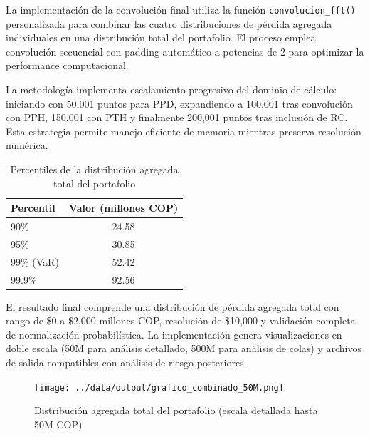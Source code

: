 La implementación de la convolución final utiliza la función \texttt{convolucion\_fft()} personalizada para combinar las cuatro distribuciones de pérdida agregada individuales en una distribución total del portafolio. El proceso emplea convolución secuencial con padding automático a potencias de 2 para optimizar la performance computacional.

La metodología implementa escalamiento progresivo del dominio de cálculo: iniciando con 50,001 puntos para PPD, expandiendo a 100,001 tras convolución con PPH, 150,001 con PTH y finalmente 200,001 puntos tras inclusión de RC. Esta estrategia permite manejo eficiente de memoria mientras preserva resolución numérica.

\begin{table}[H]
\centering
\caption{Percentiles de la distribución agregada total del portafolio}
\begin{tabular}{lc}
\hline
\textbf{Percentil} & \textbf{Valor (millones COP)} \\
\hline
90\% & 24.58 \\
95\% & 30.85 \\
99\% (VaR) & 52.42 \\
99.9\% & 92.56 \\
\hline
\end{tabular}
\end{table}

El resultado final comprende una distribución de pérdida agregada total con rango de \$0 a \$2,000 millones COP, resolución de \$10,000 y validación completa de normalización probabilística. La implementación genera visualizaciones en doble escala (50M para análisis detallado, 500M para análisis de colas) y archivos de salida compatibles con análisis de riesgo posteriores.

\begin{figure}[H]
\centering
\texttt{[image: ../data/output/grafico\_combinado\_50M.png]}
\caption{Distribución agregada total del portafolio (escala detallada hasta 50M COP)}
\end{figure}